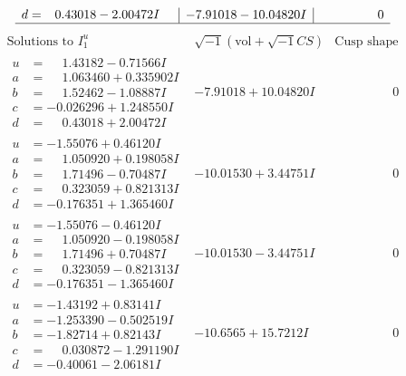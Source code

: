 \documentclass[1p]{elsarticle_modified}
\theoremstyle{definition}
\newcommand{\I}{\sqrt{-1}}
\begin{document}
$$\begin{array}{c|c|c}
\begin{aligned}
d &= \phantom{-}0.43018 - 2.00472 I\end{aligned}
 & -7.91018 - 10.04820 I & \phantom{-0.000000 } 0\\
 \hline 
 \end{array}$$\newpage$$\begin{array}{c|c|c}  
\text{Solutions to }I^u_{1}& \I (\text{vol} + \sqrt{-1}CS) & \text{Cusp shape}\\
 \hline 
\begin{aligned}
u &= \phantom{-}1.43182 - 0.71566 I \\
a &= \phantom{-}1.063460 + 0.335902 I \\
b &= \phantom{-}1.52462 - 1.08887 I \\
c &= -0.026296 + 1.248550 I \\
d &= \phantom{-}0.43018 + 2.00472 I\end{aligned}
 & -7.91018 + 10.04820 I & \phantom{-0.000000 } 0 \\ \hline\begin{aligned}
u &= -1.55076 + 0.46120 I \\
a &= \phantom{-}1.050920 + 0.198058 I \\
b &= \phantom{-}1.71496 - 0.70487 I \\
c &= \phantom{-}0.323059 + 0.821313 I \\
d &= -0.176351 + 1.365460 I\end{aligned}
 & -10.01530 + 3.44751 I & \phantom{-0.000000 } 0 \\ \hline\begin{aligned}
u &= -1.55076 - 0.46120 I \\
a &= \phantom{-}1.050920 - 0.198058 I \\
b &= \phantom{-}1.71496 + 0.70487 I \\
c &= \phantom{-}0.323059 - 0.821313 I \\
d &= -0.176351 - 1.365460 I\end{aligned}
 & -10.01530 - 3.44751 I & \phantom{-0.000000 } 0 \\ \hline\begin{aligned}
u &= -1.43192 + 0.83141 I \\
a &= -1.253390 - 0.502519 I \\
b &= -1.82714 + 0.82143 I \\
c &= \phantom{-}0.030872 - 1.291190 I \\
d &= -0.40061 - 2.06181 I\end{aligned}
 & -10.6565 + 15.7212 I & \phantom{-0.000000 } 0 \\ \hline\begin{aligned}

\end{aligned}
\end{array}$$
\end{document}
